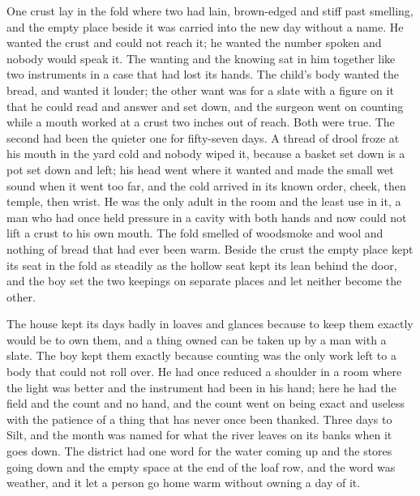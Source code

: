 One crust lay in the fold where two had lain, brown-edged and stiff past smelling, and the empty place beside it was carried into the new day without a name. He wanted the crust and could not reach it; he wanted the number spoken and nobody would speak it. The wanting and the knowing sat in him together like two instruments in a case that had lost its hands. The child's body wanted the bread, and wanted it louder; the other want was for a slate with a figure on it that he could read and answer and set down, and the surgeon went on counting while a mouth worked at a crust two inches out of reach. Both were true. The second had been the quieter one for fifty-seven days. A thread of drool froze at his mouth in the yard cold and nobody wiped it, because a basket set down is a pot set down and left; his head went where it wanted and made the small wet sound when it went too far, and the cold arrived in its known order, cheek, then temple, then wrist. He was the only adult in the room and the least use in it, a man who had once held pressure in a cavity with both hands and now could not lift a crust to his own mouth. The fold smelled of woodsmoke and wool and nothing of bread that had ever been warm. Beside the crust the empty place kept its seat in the fold as steadily as the hollow seat kept its lean behind the door, and the boy set the two keepings on separate places and let neither become the other.

The house kept its days badly in loaves and glances because to keep them exactly would be to own them, and a thing owned can be taken up by a man with a slate. The boy kept them exactly because counting was the only work left to a body that could not roll over. He had once reduced a shoulder in a room where the light was better and the instrument had been in his hand; here he had the field and the count and no hand, and the count went on being exact and useless with the patience of a thing that has never once been thanked. Three days to Silt, and the month was named for what the river leaves on its banks when it goes down. The district had one word for the water coming up and the stores going down and the empty space at the end of the loaf row, and the word was weather, and it let a person go home warm without owning a day of it.

